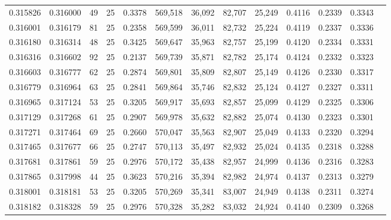 \begin{tabular}{rrrrrrrrrrrrr}
0.315826 & 0.316000 &    49 &  25 &                                     0.3378 & 569,518 &  36,092 &  82,707 &  25,249 & 0.4116 & 0.2339 & 0.3343 \\
0.316001 & 0.316179 &    81 &  25 &                                     0.2358 & 569,599 &  36,011 &  82,732 &  25,224 & 0.4119 & 0.2337 & 0.3336 \\
0.316180 & 0.316314 &    48 &  25 &                                     0.3425 & 569,647 &  35,963 &  82,757 &  25,199 & 0.4120 & 0.2334 & 0.3331 \\
0.316316 & 0.316602 &    92 &  25 &                                     0.2137 & 569,739 &  35,871 &  82,782 &  25,174 & 0.4124 & 0.2332 & 0.3323 \\
0.316603 & 0.316777 &    62 &  25 &                                     0.2874 & 569,801 &  35,809 &  82,807 &  25,149 & 0.4126 & 0.2330 & 0.3317 \\
0.316779 & 0.316964 &    63 &  25 &                                     0.2841 & 569,864 &  35,746 &  82,832 &  25,124 & 0.4127 & 0.2327 & 0.3311 \\
0.316965 & 0.317124 &    53 &  25 &                                     0.3205 & 569,917 &  35,693 &  82,857 &  25,099 & 0.4129 & 0.2325 & 0.3306 \\
0.317129 & 0.317268 &    61 &  25 &                                     0.2907 & 569,978 &  35,632 &  82,882 &  25,074 & 0.4130 & 0.2323 & 0.3301 \\
0.317271 & 0.317464 &    69 &  25 &                                     0.2660 & 570,047 &  35,563 &  82,907 &  25,049 & 0.4133 & 0.2320 & 0.3294 \\
0.317465 & 0.317677 &    66 &  25 &                                     0.2747 & 570,113 &  35,497 &  82,932 &  25,024 & 0.4135 & 0.2318 & 0.3288 \\
0.317681 & 0.317861 &    59 &  25 &                                     0.2976 & 570,172 &  35,438 &  82,957 &  24,999 & 0.4136 & 0.2316 & 0.3283 \\
0.317865 & 0.317998 &    44 &  25 &                                     0.3623 & 570,216 &  35,394 &  82,982 &  24,974 & 0.4137 & 0.2313 & 0.3279 \\
0.318001 & 0.318181 &    53 &  25 &                                     0.3205 & 570,269 &  35,341 &  83,007 &  24,949 & 0.4138 & 0.2311 & 0.3274 \\
0.318182 & 0.318328 &    59 &  25 &                                     0.2976 & 570,328 &  35,282 &  83,032 &  24,924 & 0.4140 & 0.2309 & 0.3268 \\

\end{tabular}
